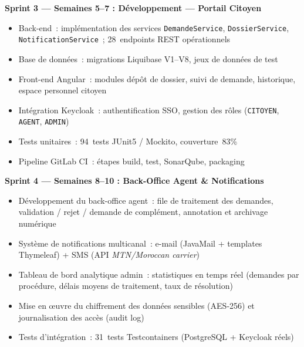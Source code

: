 \documentclass[a4paper,11pt]{article}
\begin{document}
\vspace{0.6em}

\begin{mdframed}[style=SprintBox]
{\sffamily\bfseries\color{InstitBlue}
  Sprint 3 --- Semaines 5--7 : D\'{e}veloppement --- Portail Citoyen}
\begin{itemize}
  \item Back-end~: impl\'{e}mentation des services
        \texttt{DemandeService}, \texttt{DossierService}, \texttt{NotificationService}~;
        28~endpoints REST op\'{e}rationnels
  \item Base de donn\'{e}es~: migrations Liquibase V1--V8, jeux de donn\'{e}es de test
  \item Front-end Angular~: modules d\'{e}p\^{o}t de dossier, suivi de demande,
        historique, espace personnel citoyen
  \item Int\'{e}gration Keycloak~: authentification SSO, gestion des rôles
        (\texttt{CITOYEN}, \texttt{AGENT}, \texttt{ADMIN})
  \item Tests unitaires~: 94~tests JUnit5 / Mockito, couverture~83\%
  \item Pipeline GitLab CI~: \'{e}tapes build, test, SonarQube, packaging
\end{itemize}
\end{mdframed}

\vspace{0.6em}

\begin{mdframed}[style=SprintBox]
{\sffamily\bfseries\color{InstitBlue}
  Sprint 4 --- Semaines 8--10 : Back-Office Agent \& Notifications}
\begin{itemize}
  \item D\'{e}veloppement du back-office agent~: file de traitement des demandes,
        validation / rejet / demande de compl\'{e}ment, annotation et archivage num\'{e}rique
  \item Syst\`{e}me de notifications multicanal~:
        e-mail (JavaMail + templates Thymeleaf) + SMS (API \textit{MTN/Moroccan carrier})
  \item Tableau de bord analytique admin~: statistiques en temps r\'{e}el
        (demandes par proc\'{e}dure, d\'{e}lais moyens de traitement, taux de r\'{e}solution)
  \item Mise en œuvre du chiffrement des donn\'{e}es sensibles (AES-256)
        et journalisation des acc\`{e}s (audit log)
  \item Tests d'int\'{e}gration~: 31~tests Testcontainers (PostgreSQL + Keycloak r\'{e}els)
\end{itemize}
\end{mdframed}
\end{document}
